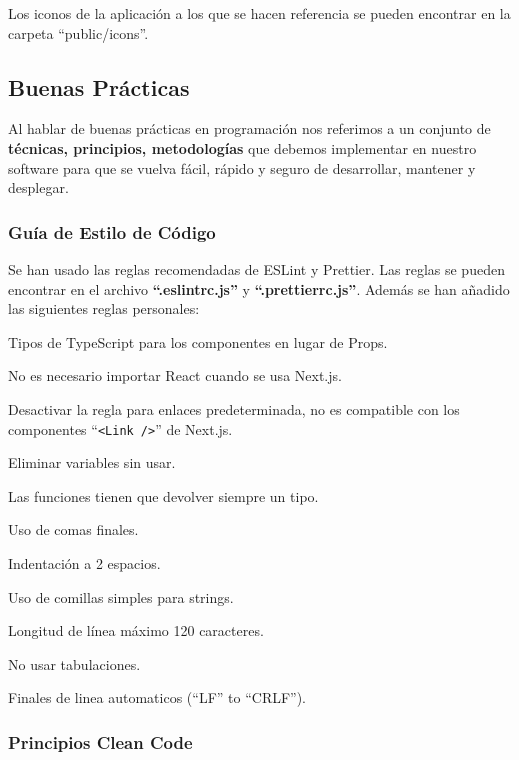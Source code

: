 \documentclass[12pt,twoside,titlepage]{report}
\begin{document}
Los iconos de la aplicación a los que se hacen referencia se pueden encontrar en la carpeta ``public/icons''.


\subsection{Buenas Prácticas}

Al hablar de buenas prácticas en programación nos referimos a un conjunto de \textbf{técnicas, principios, metodologías} que debemos implementar en nuestro software para que se vuelva fácil, rápido y seguro de desarrollar, mantener y desplegar.

\subsubsection{Guía de Estilo de Código}

Se han usado las reglas recomendadas de ESLint y Prettier. Las reglas se pueden encontrar en el archivo \textbf{``.eslintrc.js''} y \textbf{``.prettierrc.js''}. Además se han añadido las siguientes reglas personales:

\begin{compactitem}
    \item Tipos de TypeScript para los componentes en lugar de Props.
    \item No es necesario importar React cuando se usa Next.js.
    \item Desactivar la regla para enlaces predeterminada, no es compatible con los componentes ``\texttt{<Link />}'' de Next.js.
    \item Eliminar variables sin usar.
    \item Las funciones tienen que devolver siempre un tipo.
    \item Uso de comas finales.
    \item Indentación a 2 espacios.
    \item Uso de comillas simples para strings.
    \item Longitud de línea máximo 120 caracteres.
    \item No usar tabulaciones.
    \item Finales de linea automaticos (``LF'' to ``CRLF'').
\end{compactitem}

\subsubsection{Principios Clean Code}
\end{document}
